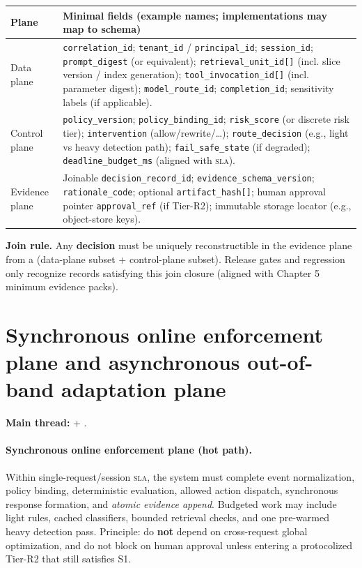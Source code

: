 \documentclass[11pt,a4paper]{report}
\begin{document}
\begin{center}
\footnotesize
\begin{tabular}{@{}p{}p{}@{}}
\toprule
\textbf{Plane} & \textbf{Minimal fields (example names; implementations may map to schema)} \\
\midrule
Data plane & \texttt{correlation\_id}; \texttt{tenant\_id} / \texttt{principal\_id}; \texttt{session\_id}; \texttt{prompt\_digest} (or equivalent); \texttt{retrieval\_unit\_id[]} (incl. slice version / index generation); \texttt{tool\_invocation\_id[]} (incl. parameter digest); \texttt{model\_route\_id}; \texttt{completion\_id}; sensitivity labels (if applicable). \\
Control plane & \texttt{policy\_version}; \texttt{policy\_binding\_id}; \texttt{risk\_score} (or discrete risk tier); \texttt{intervention} (allow/rewrite/\ldots); \texttt{route\_decision} (e.g., light vs heavy detection path); \texttt{fail\_safe\_state} (if degraded); \texttt{deadline\_budget\_ms} (aligned with \textsc{sla}). \\
Evidence plane & Joinable \texttt{decision\_record\_id}; \texttt{evidence\_schema\_version}; \texttt{rationale\_code}; optional \texttt{artifact\_hash[]}; human approval pointer \texttt{approval\_ref} (if Tier-R2); immutable storage locator (e.g., object-store keys). \\
\bottomrule
\end{tabular}
\end{center}

\noindent\textbf{Join rule.} Any \textbf{decision} must be uniquely reconstructible in the evidence plane from a (data-plane subset + control-plane subset). Release gates and regression only recognize records satisfying this join closure (aligned with Chapter 5 minimum evidence packs).

\section{Synchronous online enforcement plane and asynchronous out-of-band adaptation plane}
\textbf{Main thread:} \ControlPlane{} + \DecoupledSafety{}.

\paragraph{Synchronous online enforcement plane (hot path).} Within single-request/session \textsc{sla}, the system must complete event normalization, policy binding, deterministic evaluation, allowed action dispatch, synchronous response formation, and \emph{atomic evidence append}. Budgeted work may include light rules, cached classifiers, bounded retrieval checks, and one pre-warmed heavy detection pass. Principle: do \textbf{not} depend on cross-request global optimization, and do not block on human approval unless entering a protocolized Tier-R2 that still satisfies S1.
\end{document}
